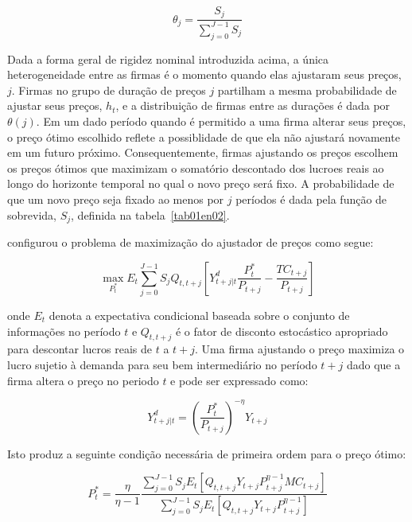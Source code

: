 \documentclass[twoside,a4paper,11pt]{report}
\begin{document}
\begin{equation}\label{eq14en02}
{\theta}_{j}=\frac{{S}_{j}}{\sum _{j=0}^{J-1}{{S}_{j}}} 
\end{equation}

Dada a forma geral de rigidez nominal introduzida acima, a única heterogeneidade entre as firmas é o momento quando elas ajustaram seus preços, $j$. Firmas no grupo de duração de preços $j$ partilham a mesma probabilidade de ajustar seus preços, $h_{t}$, e a distribuição de firmas entre as durações é dada por ${\theta}(j)$. Em um dado período quando é permitido a uma firma alterar seus preços, o preço ótimo escolhido reflete a possiblidade de que ela não ajustará novamente em um futuro próximo. Consequentemente, firmas ajustando os preços escolhem os preços ótimos que maximizam o somatório descontado dos lucroes reais ao longo do horizonte temporal no qual o novo preço será fixo. A probabilidade de que um novo preço seja fixado ao menos por $j$ períodos é dada pela função de sobrevida, $S_{j}$, definida na tabela~\ref{tab01en02}.

\citet{yao2010aggregate} configurou o problema de maximização do ajustador de preços como segue:

\begin{equation}\label{eq15en02}
\max _{{P}_{t}^{*}}{{E}_{t}\sum _{j=0}^{J-1}{{S}_{j}{Q}_{t,t+j}[{Y}_{t+j|t}^{d}\frac{{P}_{t}^{*}}{{P}_{t+j}}-\frac{{TC}_{t+j }}{{P}_{t+j}}]}} 
\end{equation}

\noindent onde ${ E }_{ t }$ denota a expectativa condicional baseada sobre o conjunto de informações no período $t$ e ${ Q }_{ t,t+j }$ é o fator de disconto estocástico apropriado para descontar lucros reais de $t$ a $t+j$. Uma firma ajustando o preço maximiza o lucro sujetio à demanda para seu bem intermediário no período $t+j$ dado que a firma altera o preço no periodo $t$ e pode ser expressado como: 

\begin{equation}\label{eq16en02}
{ Y }_{ t+j|t }^{ d }={ \left( \frac { { P }_{ t }^{ * } }{ { P }_{ t+j } }  \right)  }^{ -\eta  }{ Y }_{ t+j }
\end{equation}

Isto produz a seguinte condição necessária de primeira ordem para o preço ótimo:

\begin{equation}\label{eq17en02}
{P}_{t}^{*}=\frac{\eta}{\eta -1}\frac{\sum_{j=0}^{J-1}{{S}_{j}{E}_{t}[{Q}_{t,t+j}{Y}_{t+j}{P}_{t+j}^{\eta -1}{MC}_{t+j}]}}{\sum_{j=0}^{J-1}{{S}_{j}{E}_{t}[{Q}_{t,t+j}{Y}_{t+j}{P}_{t+j}^{\eta -1}]}} 
\end{equation}
\end{document}
